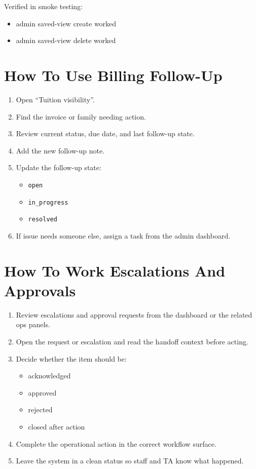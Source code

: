 \documentclass[11pt]{article}
\begin{document}
Verified in smoke testing:
\begin{itemize}
  \item admin saved-view create worked
  \item admin saved-view delete worked
\end{itemize}

\section*{How To Use Billing Follow-Up}
\begin{enumerate}
  \item Open ``Tuition visibility''.
  \item Find the invoice or family needing action.
  \item Review current status, due date, and last follow-up state.
  \item Add the new follow-up note.
  \item Update the follow-up state:
  \begin{itemize}
    \item \texttt{open}
    \item \texttt{in\_progress}
    \item \texttt{resolved}
  \end{itemize}
  \item If issue needs someone else, assign a task from the admin dashboard.
\end{enumerate}

\section*{How To Work Escalations And Approvals}
\begin{enumerate}
  \item Review escalations and approval requests from the dashboard or the related ops panels.
  \item Open the request or escalation and read the handoff context before acting.
  \item Decide whether the item should be:
  \begin{itemize}
    \item acknowledged
    \item approved
    \item rejected
    \item closed after action
  \end{itemize}
  \item Complete the operational action in the correct workflow surface.
  \item Leave the system in a clean status so staff and TA know what happened.
\end{enumerate}
\end{document}
